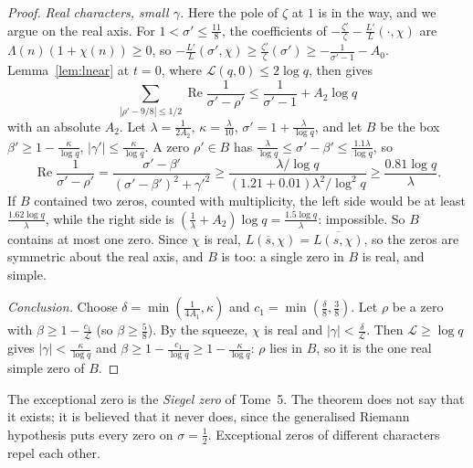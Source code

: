 \begin{proof}
\emph{Real characters, small $\gamma$.} Here the pole of $\zeta$ at $1$ is in the way, and we argue on the real axis. For $1<\sigma'\le\frac{11}8$, the coefficients of $-\frac{\zeta'}\zeta-\frac{L'}L(\cdot,\chi)$ are $\Lambda(n)(1+\chi(n))\ge0$, so $-\frac{L'}L(\sigma',\chi)\ge\frac{\zeta'}\zeta(\sigma')\ge-\frac1{\sigma'-1}-A_0$. Lemma~\ref{lem:lnear} at $t=0$, where $\mathcal L(q,0)\le2\log q$, then gives
\[
\sum_{|\rho'-9/8|\le1/2}\operatorname{Re}\frac1{\sigma'-\rho'}\le\frac1{\sigma'-1}+A_2\log q
\]
with an absolute $A_2$. Let $\lambda=\frac1{2A_2}$, $\kappa=\frac\lambda{10}$, $\sigma'=1+\frac\lambda{\log q}$, and let $B$ be the box $\beta'\ge1-\frac\kappa{\log q}$, $|\gamma'|\le\frac\kappa{\log q}$. A zero $\rho'\in B$ has $\frac\lambda{\log q}\le\sigma'-\beta'\le\frac{1.1\lambda}{\log q}$, so
\[
\operatorname{Re}\frac1{\sigma'-\rho'}=\frac{\sigma'-\beta'}{(\sigma'-\beta')^2+\gamma'^2}\ge\frac{\lambda/\log q}{(1.21+0.01)\lambda^2/\log^2q}\ge\frac{0.81\log q}\lambda .
\]
If $B$ contained two zeros, counted with multiplicity, the left side would be at least $\frac{1.62\log q}\lambda$, while the right side is $(\frac1\lambda+A_2)\log q=\frac{1.5\log q}\lambda$: impossible. So $B$ contains at most one zero. Since $\chi$ is real, $L(\overline s,\chi)=\overline{L(s,\chi)}$, so the zeros are symmetric about the real axis, and $B$ is too: a single zero in $B$ is real, and simple.

\emph{Conclusion.} Choose $\delta=\min(\frac1{4A_1},\kappa)$ and $c_1=\min(\frac\delta8,\frac38)$. Let $\rho$ be a zero with $\beta\ge1-\frac{c_1}{\mathcal L}$ (so $\beta\ge\frac58$). By the squeeze, $\chi$ is real and $|\gamma|<\frac\delta{\mathcal L}$. Then $\mathcal L\ge\log q$ gives $|\gamma|<\frac\kappa{\log q}$ and $\beta\ge1-\frac{c_1}{\log q}\ge1-\frac\kappa{\log q}$: $\rho$ lies in $B$, so it is the one real simple zero of $B$.
\end{proof}

The exceptional zero is the \emph{Siegel zero} of Tome~5. The theorem does not say that it exists; it is believed that it never does, since the generalised Riemann hypothesis puts every zero on $\sigma=\frac12$. Exceptional zeros of different characters repel each other.

